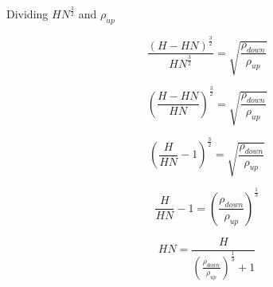 \documentclass[a4paper, english]{article}
\begin{document}
            Dividing $ HN^{\frac{3}{2}} $ and  $ \rho _{up} $
            
            \begin{equation*}
                \frac{(H - HN)^{\frac{3}{2}} }{ {HN^{\frac{3}{2}} } }  = \sqrt{ \frac{ \rho _{down} } { \rho _{up} } }
            \end{equation*}   

            \begin{equation*}
                { \left( \frac{ H - HN }{ HN } \right) } ^{\frac{3}{2}}  = \sqrt{ \frac{ \rho _{down} } { \rho _{up} } }
            \end{equation*}
            
            \begin{equation*}
                { \left( \frac{ H }{ HN } - 1 \right) } ^{\frac{3}{2}}  = \sqrt{ \frac{ \rho _{down} } { \rho _{up} } }
            \end{equation*} 
            
            \begin{equation*}
                \frac{ H }{ HN } - 1  = {\left( \frac{ \rho _{down} } { \rho _{up} } \right)}^\frac{ 1 }{ 3 }
            \end{equation*} 
            
            \begin{equation}
                \label{eq22}
                HN  = \frac{H}{ {\left( \frac{ \rho _{down} } { \rho _{up} } \right)}^\frac{ 1 }{ 3 } + 1 }
            \end{equation} 
    
\end{document}
